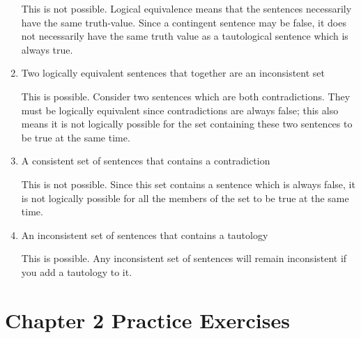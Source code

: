 \documentclass[12pt, letterpaper, twoside]{article}
\begin{document}
\begin{enumerate}
    This is not possible. Logical equivalence means that the
    sentences necessarily have the same truth-value. Since a
    contingent sentence may be false, it does not
    necessarily have the same truth value as a tautological
    sentence which is always true.

    \item Two logically equivalent sentences that together
      are an inconsistent set

    This is possible. Consider two sentences which are both
    contradictions. They must be logically equivalent since
    contradictions are always false; this also means it is
    not logically possible for the set containing these two
    sentences to be true at the same time.

    \item A consistent set of sentences that contains a
      contradiction

    This is not possible. Since this set contains a sentence
    which is always false, it is not logically possible for
    all the members of the set to be true at the same time.

    \item An inconsistent set of sentences that contains a
      tautology

    This is possible. Any inconsistent set of sentences will
    remain inconsistent if you add a tautology to it.
\end{enumerate}

\section{Chapter 2 Practice Exercises}
 
\end{document}
